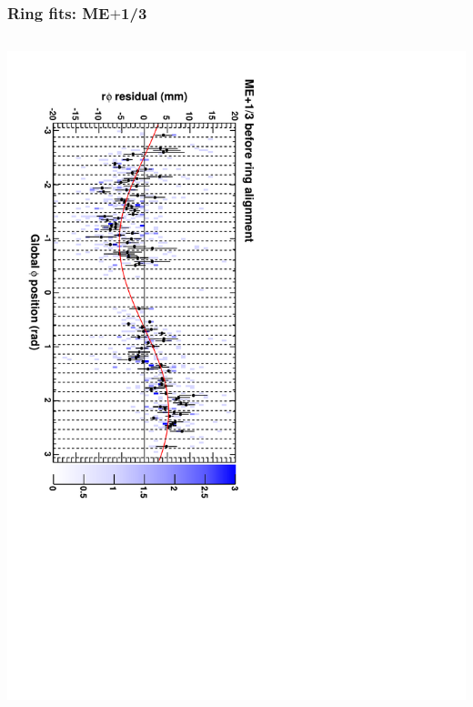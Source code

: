 \documentclass[compress]{beamer}
\begin{document}
\begin{frame}
\frametitle{Ring fits: ME$+$1/3}
\vfill
\begin{columns}
\includegraphics[height=\linewidth, angle=90]{ringfits_before/mep13.pdf}


\end{columns}
\end{frame}
\end{document}
